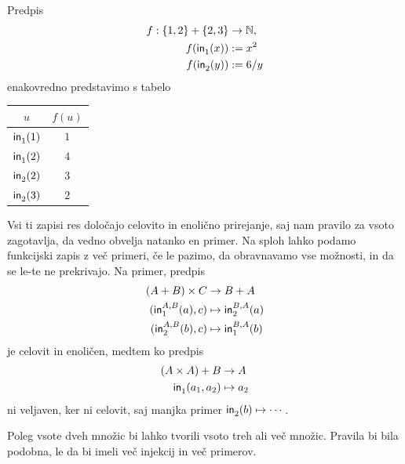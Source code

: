 \begin{zgled}
  Predpis
  \begin{align*}
    f : \set{1, 2} + \set{2, 3} &\to \NN, \\
    f(\inl(x)) &\dfeq x^2 \\
    f(\inr(y)) &\dfeq 6 / y
  \end{align*}
  enakovredno predstavimo s tabelo
  \begin{center}
    \begin{tabular}{cc}
      \toprule
      $u$ & $f(u)$ \\ \midrule
      $\inl(1)$ & $1$ \\
      $\inl(2)$ & $4$ \\
      $\inr(2)$ & $3$ \\
      $\inr(3)$ & $2$ \\ \bottomrule
    \end{tabular}
  \end{center}
\end{zgled}

Vsi ti zapisi res določajo celovito in enolično prirejanje, saj nam pravilo za vsoto
zagotavlja, da vedno obvelja natanko en primer. Na sploh lahko podamo funkcijski zapis z
več primeri, če le pazimo, da obravnavamo vse možnosti, in da se le-te ne prekrivajo.
Na primer, predpis
%
\begin{align*}
  (A + B) \times C &\to B + A \\
  (\inl[A][B](a), c) &\mapsto \inr[B][A](a) \\
  (\inr[A][B](b), c) &\mapsto \inl[B][A](b)
\end{align*}
%
je celovit in enoličen, medtem ko predpis
%
\begin{align*}
  (A \times A) + B &\to A \\
  \inl(a_1, a_2) &\mapsto a_2
\end{align*}
%
ni veljaven, ker ni celovit, saj manjka primer $\inr(b) \mapsto \cdots$.

Poleg vsote dveh množic bi lahko tvorili vsoto treh ali več množic. Pravila bi bila
podobna, le da bi imeli več injekcij in več primerov.






